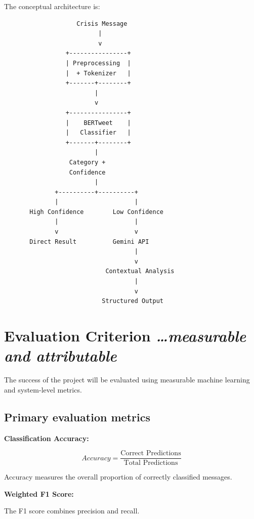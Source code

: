 \documentclass[11pt,a4paper]{article}
\newcommand{\BvrHint}[1]{%
  {\normalfont\normalsize\itshape\hfill #1}}
\begin{document}
The conceptual architecture is:

\begin{verbatim}
                    Crisis Message
                          |
                          v
                 +----------------+
                 | Preprocessing  |
                 |  + Tokenizer   |
                 +-------+--------+
                         |
                         v
                 +----------------+
                 |    BERTweet    |
                 |   Classifier   |
                 +-------+--------+
                         |
                  Category +
                  Confidence
                         |
              +----------+----------+
              |                     |
       High Confidence        Low Confidence
              |                     |
              v                     v
       Direct Result          Gemini API
                                    |
                                    v
                            Contextual Analysis
                                    |
                                    v
                           Structured Output
\end{verbatim}


\section{Evaluation Criterion %
\BvrHint{\ldots measurable and attributable}}

The success of the project will be evaluated using measurable machine
learning and system-level metrics.

\subsection{Primary evaluation metrics}

\textbf{Classification Accuracy:}

\begin{equation}
Accuracy =
\frac{\text{Correct Predictions}}
{\text{Total Predictions}}
\end{equation}

Accuracy measures the overall proportion of correctly classified messages.

\textbf{Weighted F1 Score:}

The F1 score combines precision and recall.
\end{document}
